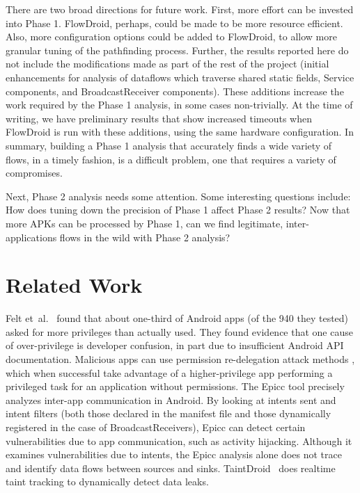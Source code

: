 There are two broad directions for future work.  First, more effort can be invested into Phase 1.  FlowDroid, perhaps, could be made to be more resource efficient.  Also, more configuration options could be added to FlowDroid, to allow more granular tuning of the pathfinding process.  Further, the results reported here do not include the modifications made as part of the rest of the project (initial enhancements for analysis of dataflows which traverse shared static fields, Service components, and BroadcastReceiver components).  These additions increase the work required by the Phase 1 analysis, in some cases non-trivially.  At the time of writing, we have preliminary results that show increased timeouts when FlowDroid is run with these additions, using the same hardware configuration.  In summary, building a Phase 1 analysis that accurately finds a wide variety of flows, in a timely fashion, is a difficult problem, one that requires a variety of compromises. 

Next, Phase 2 analysis needs some attention.  Some interesting questions include: How does tuning down the precision of Phase 1 affect Phase 2 results?  Now that more APKs can be processed by Phase 1, can we find legitimate, inter-applications flows in the wild with Phase 2 analysis?

\chapter{Related Work}
Felt et\ al.~\cite{felt2011android} found that about one-third of Android apps (of the 940 they tested) asked for more privileges than actually used. They found evidence that one cause of over-privilege is developer confusion, in part due to insufficient Android API documentation. Malicious apps can use permission re-delegation attack methods \cite{felt2011permission}, which when successful take advantage of a higher-privilege app performing a privileged task for an application without permissions. The Epicc \cite{epicc} tool precisely analyzes inter-app communication in Android.  By looking at intents sent and intent filters (both those declared in the manifest file and those dynamically registered in the case of BroadcastReceivers), Epicc can detect certain vulnerabilities due to app communication, such as activity hijacking. Although it examines vulnerabilities due to intents, the Epicc analysis alone does not trace and identify data flows between sources and sinks. 
TaintDroid~\cite{enck2010taintdroid} does realtime taint tracking to dynamically detect data leaks.

